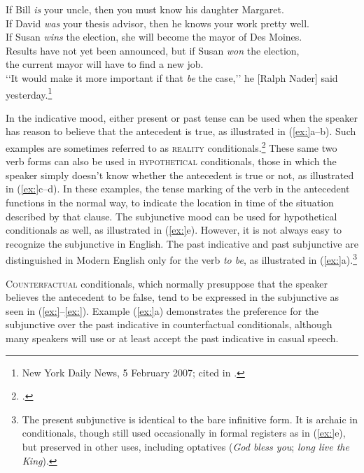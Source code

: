 \ea
\ea If Bill \textit{is} your uncle, then you must know his daughter Margaret.\\
\ex If David \textit{was} your thesis advisor, then he knows your work pretty well.\\
\ex If Susan \textit{wins} the election, she will become the mayor of Des Moines.\\
\ex Results have not yet been announced, but if Susan \textit{won} the election,\\
  the current mayor will have to find a new job.\\
\ex ‘‘It would make it more important if that \textit{be} the case,’’ he [Ralph Nader] said\\
  yesterday.\footnote{New York Daily News, 5  February 2007; cited in \citet{Gomes2008}.}
                       \z
\z


In the indicative mood, either present or past tense can be used when the speaker has reason to believe that the antecedent is true, as illustrated in (\ref{ex:}a--b). Such examples are sometimes referred to as \textsc{reality} conditionals.\footnote{\citet{ThompsonEtAl2007}.} These same two verb forms can also be used in \textsc{hypothetical} conditionals, those in which the speaker simply doesn’t know whether the antecedent is true or not, as illustrated in (\ref{ex:}c--d). In these examples, the tense marking of the verb in the antecedent functions in the normal way, to indicate the location in time of the situation described by that clause. The subjunctive mood can be used for hypothetical conditionals as well, as illustrated in (\ref{ex:}e). However, it is not always easy to recognize the subjunctive in English. The past indicative and past subjunctive are distinguished in Modern English only for the verb \textit{to be}, as illustrated in (\ref{ex:}a).\footnote{The present subjunctive is identical to the bare infinitive form. It is archaic in conditionals, though still used occasionally in formal registers as in (\ref{ex:}e), but preserved in other uses, including optatives (\textit{God bless you}; \textit{long live the King}).}



\textsc{Counterfactual} conditionals, which normally presuppose that the speaker believes the antecedent to be false, tend to be expressed in the subjunctive as seen in (\ref{ex:}--\ref{ex:}). Example (\ref{ex:}a) demonstrates the preference for the subjunctive over the past indicative in counterfactual conditionals, although many speakers will use or at least accept the past indicative in casual speech.


